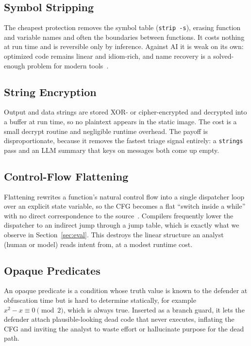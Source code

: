 \documentclass[conference]{IEEEtran}
\begin{document}
\subsection{Symbol Stripping}
The cheapest protection removes the symbol table (\texttt{strip -s}), erasing
function and variable names and often the boundaries between functions. It costs
nothing at run time and is reversible only by inference. Against AI it is weak on
its own: optimized code remains linear and idiom-rich, and name recovery is a
solved-enough problem for modern tools~\cite{gennm,funcname,howfar}.

\subsection{String Encryption}
Output and data strings are stored XOR- or cipher-encrypted and decrypted into a
buffer at run time, so no plaintext appears in the static image. The cost is a
small decrypt routine and negligible runtime overhead. The payoff is
disproportionate, because it removes the fastest triage signal entirely: a
\texttt{strings} pass and an LLM summary that keys on messages both come up empty.

\subsection{Control-Flow Flattening}
Flattening rewrites a function's natural control flow into a single dispatcher
loop over an explicit state variable, so the CFG becomes a flat ``switch inside a
while'' with no direct correspondence to the source~\cite{obf-taxonomy,ollvm}.
Compilers frequently lower the dispatcher to an indirect jump through a jump
table, which is exactly what we observe in Section~\ref{sec:eval}. This destroys
the linear structure an analyst (human or model) reads intent from, at a modest
runtime cost.

\subsection{Opaque Predicates}
An opaque predicate is a condition whose truth value is known to the defender at
obfuscation time but is hard to determine statically, for example $x^2-x \equiv 0
\pmod 2$, which is always true. Inserted as a branch guard, it lets the defender
attach plausible-looking dead code that never executes, inflating the CFG and
inviting the analyst to waste effort or hallucinate purpose for the dead path.
\end{document}
